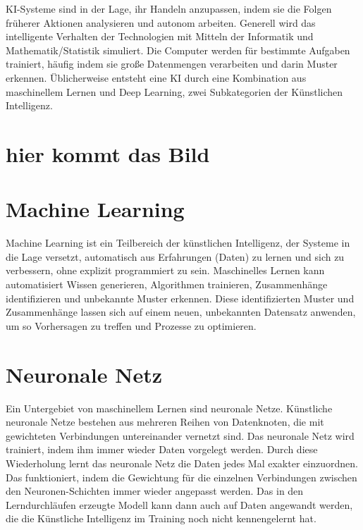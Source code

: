 \documentclass{report}
\begin{document}
KI-Systeme sind in der Lage, ihr Handeln anzupassen, indem sie die Folgen früherer Aktionen analysieren und autonom arbeiten.
 Generell wird das intelligente Verhalten der 
Technologien mit Mitteln der Informatik und Mathematik/Statistik simuliert.
 Die Computer werden für bestimmte Aufgaben trainiert, häufig indem sie große Datenmengen 
 verarbeiten und darin Muster erkennen. Üblicherweise entsteht eine KI durch eine Kombination aus maschinellem
  Lernen und Deep Learning, zwei Subkategorien der Künstlichen Intelligenz.

\section {hier kommt das Bild}

 \section{Machine Learning}
 Machine Learning ist ein Teilbereich der künstlichen Intelligenz, der Systeme in die Lage versetzt, automatisch 
 aus Erfahrungen (Daten) zu lernen und sich zu verbessern, ohne explizit programmiert zu sein.
 Maschinelles Lernen kann automatisiert Wissen generieren, Algorithmen trainieren, Zusammenhänge identifizieren und unbekannte Muster erkennen. 
 Diese identifizierten Muster und Zusammenhänge lassen sich auf einem neuen, unbekannten Datensatz anwenden, 
 um so Vorhersagen zu treffen und Prozesse zu optimieren.

\section{Neuronale Netz}
 Ein Untergebiet von maschinellem Lernen sind neuronale Netze. Künstliche neuronale Netze bestehen aus mehreren Reihen von Datenknoten, 
 die mit gewichteten Verbindungen untereinander vernetzt sind.
Das neuronale Netz wird trainiert, indem ihm immer wieder Daten vorgelegt werden. Durch diese Wiederholung lernt
das neuronale Netz die Daten jedes Mal exakter einzuordnen. Das funktioniert, indem die Gewichtung für die einzelnen Verbindungen
 zwischen den Neuronen-Schichten immer wieder angepasst werden. Das in den Lerndurchläufen 
erzeugte Modell kann dann auch auf Daten angewandt werden, die die Künstliche Intelligenz im Training noch nicht kennengelernt hat.
\end{document}

